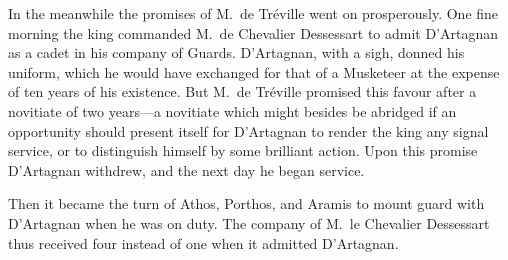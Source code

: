 In the meanwhile the promises of M.~de Tréville went on prosperously. One fine morning the king commanded M.~de Chevalier Dessessart to admit D'Artagnan as a cadet in his company of Guards. D'Artagnan, with a sigh, donned his uniform, which he would have exchanged for that of a Musketeer at the expense of ten years of his existence. But M.~de Tréville promised this favour after a novitiate of two years—a novitiate which might besides be abridged if an opportunity should present itself for D'Artagnan to render the king any signal service, or to distinguish himself by some brilliant action. Upon this promise D'Artagnan withdrew, and the next day he began service. 

Then it became the turn of Athos, Porthos, and Aramis to mount guard with D'Artagnan when he was on duty. The company of M.~le Chevalier Dessessart thus received four instead of one when it admitted D'Artagnan.

